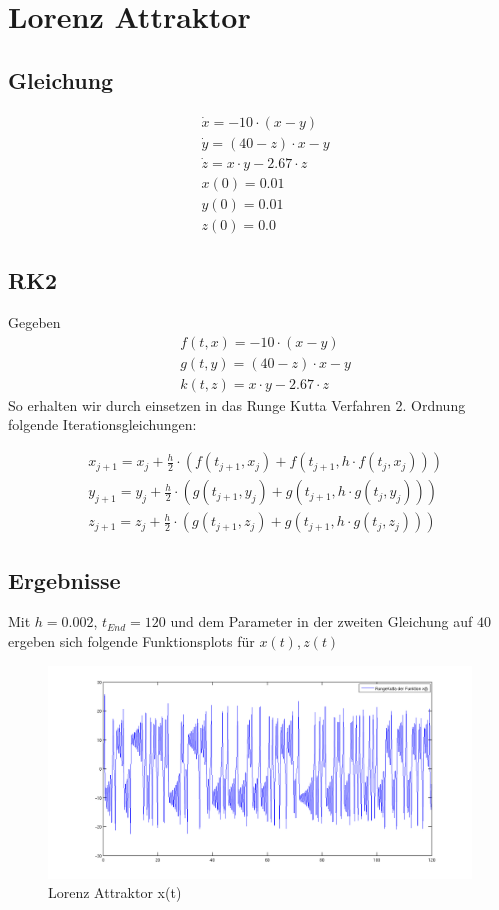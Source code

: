 \documentclass[10pt]{scrartcl}
\begin{document}
		\section{Lorenz Attraktor}
		\subsection{Gleichung}
			\begin{align}
				&\dot{x}=-10 \cdot (x-y)\\
				&\dot{y}=(40-z)\cdot x-y\\
				&\dot{z}=x \cdot y - 2.67 \cdot z\\
				&x(0)=0.01\\
				&y(0)=0.01\\
				&z(0)=0.0
			\end{align}
		
		\subsection{RK2}
		Gegeben
			\begin{align}
				&f(t,x)=-10 \cdot (x-y)\\
				&g(t,y)=(40-z)\cdot x-y\\
				&k(t,z)=x \cdot y - 2.67 \cdot z
			\end{align}
		So erhalten wir durch einsetzen in das Runge Kutta Verfahren 2. Ordnung folgende Iterationsgleichungen:
		
		\begin{align}
				&x_{j+1}=x_{j} + \frac{h}{2} \cdot (f(t_{j+1}, x_{j}) + f(t_{j+1}, h \cdot f(t_j, x_j)) )\\
				&y_{j+1}=y_{j} + \frac{h}{2} \cdot (g(t_{j+1}, y_{j}) + g(t_{j+1}, h \cdot g(t_j, y_j)) )\\
				&z_{j+1}=z_{j} + \frac{h}{2} \cdot (g(t_{j+1}, z_{j}) + g(t_{j+1}, h \cdot g(t_j, z_j)) )
		\end{align}
		
		\subsection{Ergebnisse}		
		Mit $h=0.002$, $t_{End} = 120$ und dem Parameter in der zweiten Gleichung auf $40$ ergeben sich folgende Funktionsplots für $x(t), z(t)$
		\begin{figure}[H]
			\centering	
			\includegraphics[width=\textwidth]{lorenzxt.png}
            \caption{Lorenz Attraktor x(t)}
            \label{pic:xt}
		\end{figure} 
		
\end{document}
